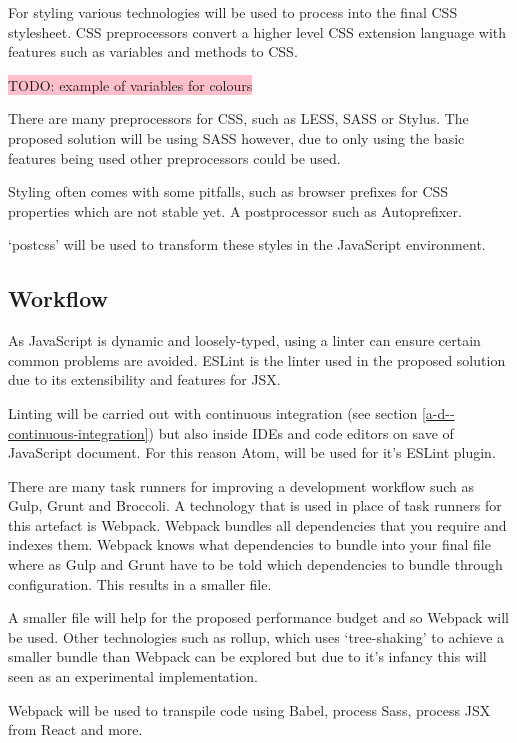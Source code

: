 For styling various technologies will be used to process into the final CSS stylesheet. CSS preprocessors convert a higher level CSS extension language with features such as variables and methods to CSS.

\colorbox{pink}{TODO: example of variables for colours}

There are many preprocessors for CSS, such as LESS, SASS or Stylus. The proposed solution will be using SASS however, due to only using the basic features being used other preprocessors could be used. \cite{SASS}

Styling often comes with some pitfalls, such as browser prefixes for CSS properties which are not stable yet. A postprocessor such as Autoprefixer. \cite{autoprefixer}

`postcss' will be used to transform these styles in the JavaScript environment. \cite{postcss}

\subsection{Workflow} \label{a-d--workflow}

As JavaScript is dynamic and loosely-typed, using a linter can ensure certain common problems are avoided. ESLint is the linter used in the proposed solution due to its extensibility and features for JSX. \cite{eslint}

Linting will be carried out with continuous integration (see section \ref{a-d--continuous-integration}) but also inside IDEs and code editors on save of JavaScript document. For this reason Atom, will be used for it's ESLint plugin.

There are many task runners for improving a development workflow such as Gulp, Grunt and Broccoli. A technology that is used in place of task runners for this artefact is Webpack. Webpack bundles all dependencies that you require and indexes them. Webpack knows what dependencies to bundle into your final file where as Gulp and Grunt have to be told which dependencies to bundle through configuration. This results in a smaller file. \cite{webpack}

A smaller file will help for the proposed performance budget and so Webpack will be used. Other technologies such as rollup, which uses `tree-shaking' to achieve a smaller bundle than Webpack can be explored but due to it's infancy this will seen as an experimental implementation. \cite{rollup}

Webpack will be used to transpile code using Babel, process Sass, process JSX from React and more.


